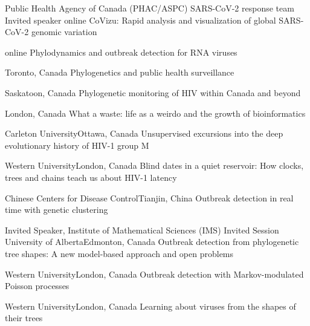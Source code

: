 {Public Health Agency of Canada (PHAC/ASPC) SARS-CoV-2 response team}
{Invited speaker}
{}{online}
{CoVizu: Rapid analysis and visualization of global SARS-CoV-2 genomic variation}

{}{online}
{Phylodynamics and outbreak detection for RNA viruses}

{}{Toronto, Canada}
{Phylogenetics and public health surveillance}

{}{Saskatoon, Canada}
{Phylogenetic monitoring of HIV within Canada and beyond}

{}{London, Canada}
{What a waste: life as a weirdo and the growth of bioinformatics}

{Carleton University}{Ottawa, Canada}
{Unsupervised excursions into the deep evolutionary history of HIV-1 group M}

{Western University}{London, Canada}
{Blind dates in a quiet reservoir: How clocks, trees and chains teach us about HIV-1 latency}

{Chinese Centers for Disease Control}{Tianjin, China}
{Outbreak detection in real time with genetic clustering}

{Invited Speaker, Institute of Mathematical Sciences (IMS) Invited Session}
{University of Alberta}{Edmonton, Canada}
{Outbreak detection from phylogenetic tree shapes: A new model-based approach and open problems}

{Western University}{London, Canada}
{Outbreak detection with Markov-modulated Poisson processes}

{Western University}{London, Canada}
{Learning about viruses from the shapes of their trees}

